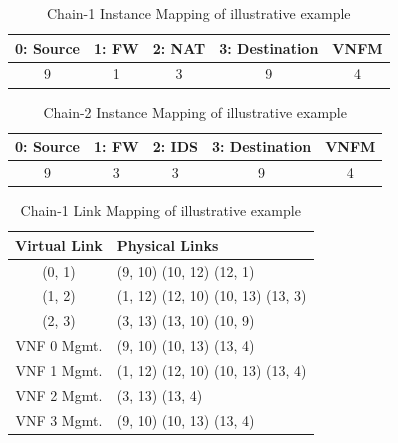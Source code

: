 \begin{table}
    \centering
    \caption{Chain-1 Instance Mapping of illustrative example}
    \begin{tabular}{|c|c|c|c|c|}
        \hline
        0: Source & 1: FW & 2: NAT & 3: Destination & VNFM \\
        \hline
        9 & 1 & 3 & 9 & 4 \\
        \hline
    \end{tabular}
    \label{tbl:example-chain-1-mapping}
\end{table}

\begin{table}
    \centering
    \caption{Chain-2 Instance Mapping of illustrative example}
    \begin{tabular}{|c|c|c|c|c|}
        \hline
        0: Source & 1: FW & 2: IDS & 3: Destination & VNFM \\
        \hline
        9 & 3 & 3 & 9 & 4 \\
        \hline
    \end{tabular}
    \label{tbl:example-chain-2-mapping}
\end{table}

\begin{table}
    \centering
    \caption{Chain-1 Link Mapping of illustrative example}
    \begin{tabular}{|c|l|}
        \hline
        Virtual Link & Physical Links \\
        \hline
        (0, 1) & (9, 10) (10, 12) (12, 1) \\
        \hline
        (1, 2) & (1, 12) (12, 10) (10, 13) (13, 3) \\
        \hline
        (2, 3) & (3, 13) (13, 10) (10, 9) \\
        \hline
        VNF 0 Mgmt. & (9, 10) (10, 13) (13, 4) \\
        \hline
        VNF 1 Mgmt. & (1, 12) (12, 10) (10, 13) (13, 4) \\
        \hline
        VNF 2 Mgmt. & (3, 13) (13, 4) \\
        \hline
        VNF 3 Mgmt. & (9, 10) (10, 13) (13, 4) \\
        \hline
    \end{tabular}
    \label{tbl:example-chain-1-links}
\end{table}

